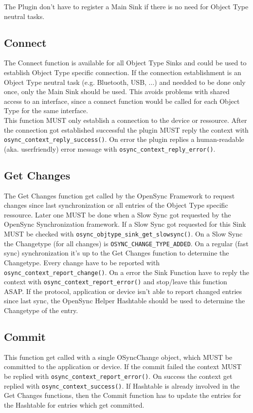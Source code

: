 The Plugin don't have to register a Main Sink if there is no need for Object 
Type neutral tasks.
\subsection{Connect}
The Connect function is available for all Object Type Sinks and could be used to
establish Object Type specific connection. If the connection establishment is an
Object Type neutral task (e.g. Bluetooth, USB, ...) and needded to be done only
once, only the Main Sink should be used. This avoids problems with shared access
to an interface, since a connect function would be called for each Object Type
for the same interface.\\
This function MUST only establish a connection to the device or ressource. After
the connection got established successful the plugin MUST reply the context with
\verb|osync_context_reply_success()|. On error the plugin replies a 
human-readable
(aka. userfriendly) error message with \verb|osync_context_reply_error()|.
\subsection{Get Changes}
The Get Changes function get called by the OpenSync Framework to request changes
since last synchronization or all entries of the Object Type specific ressource.
Later one MUST be done when a Slow Sync got requested by the OpenSync
Synchronization framework. If a Slow Sync got requested for this Sink MUST be
checked with \verb|osync_objtype_sink_get_slowsync()|. On a Slow Sync the 
Changetype (for all changes) is \verb|OSYNC_CHANGE_TYPE_ADDED|. On a regular 
(fast sync) synchronization it's up to the Get Changes function to determine 
the Changetype. Every change have to be reported with 
\verb|osync_context_report_change()|. On a error the Sink Function have to 
reply the context with \verb|osync_context_report_error()| and stop/leave this 
function ASAP. If the protocol, application or device isn't able to report 
changed entries since last sync, the OpenSync Helper Hashtable should be used 
to determine the Changetype of the entry.
\subsection{Commit}
This function get called with a single OSyncChange object, which MUST be
committed to the application or device. If the commit failed the context MUST be
replied with \verb|osync_context_report_error()|. On success the context get 
replied with \verb|osync_context_success()|. If Hashtable is already involved in
the Get Changes functions, then the Commit function has to update the entries 
for the Hashtable for entries which get committed.
